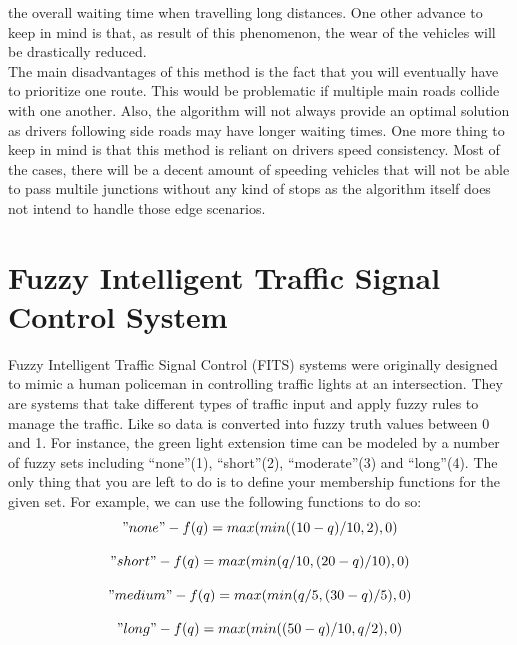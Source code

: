\documentclass[17pt]{report}
\begin{document}
the overall waiting time when travelling long distances. One other advance to keep in
mind is that, as result of this phenomenon, the wear of the vehicles will be
drastically reduced.\\
\indent \indent
The main disadvantages of this method is the fact that you will eventually have to
prioritize one route. This would be problematic if multiple main roads collide with
one another. Also, the algorithm will not always provide an optimal solution as
drivers following side roads may have longer waiting times. One more thing to keep in mind
is that this method is reliant on drivers speed consistency. Most of the cases, there 
will be a decent amount of speeding vehicles that will not be able to pass multile
junctions without any kind of stops as the algorithm itself does not intend to handle those 
edge scenarios.

\section{Fuzzy Intelligent Traffic Signal Control System}
\indent \indent
Fuzzy Intelligent Traffic Signal Control (FITS) \cite{Teo2010} \cite{Jin2017}
systems were originally designed to mimic a human policeman in controlling
traffic lights at an intersection. They are systems that take
different types of traffic input and apply fuzzy rules to 
manage the traffic. Like so data is converted into fuzzy truth
values between 0 and 1. For instance, the green light extension
time can be modeled by a number of fuzzy sets including “none”(1),
“short”(2), “moderate”(3) and “long”(4). The only thing that you are left to do is
to define your membership functions for the given set. For example, we can
use the following functions to do so:\\

\begin{equation}
    "none" - f(q) = max(min((10 - q) / 10, 2), 0)
\end{equation}

\begin{equation}
    "short" - f(q) = max(min(q / 10, (20 - q) / 10), 0)
\end{equation}

\begin{equation}
    "medium" - f(q) = max(min(q / 5, (30 - q) / 5), 0)
\end{equation}

\begin{equation}
    "long" - f(q) = max(min((50 - q) / 10, q / 2), 0)
\end{equation}
\end{document}
